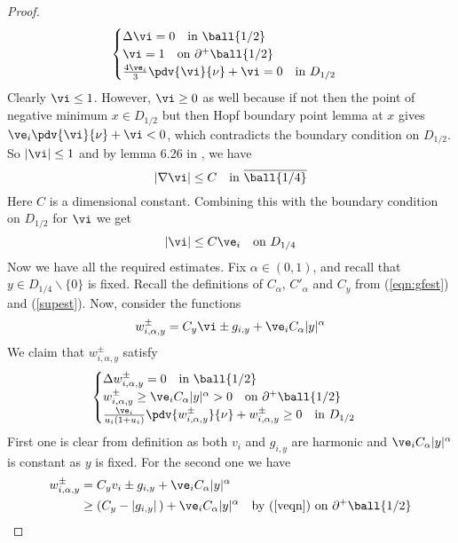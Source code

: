 \begin{proof}
\begin{equation}\label{veqn}
    \begin{cases}
        \Delta \vi =0 \quad \text{in } \ball {1/2} \\
        \vi = 1  \quad \text{on } \partial^{+}\ball {1/2} \\
        \frac{4\ve_i}{3} \pdv{\vi}{\nu} + \vi = 0 \quad \text{in } D_{1/2} 
    \end{cases}   
\end{equation}
Clearly $\vi \leq 1$. However, $\vi \geq 0$ as well because if not then the point of negative minimum $x \in D_{1/2}$ but then Hopf boundary point lemma at $x$ gives $\ve_i \pdv{\vi}{\nu} + \vi <0$, which contradicts the boundary condition on $D_{1/2}$. So $|\vi|\leq 1$ and by lemma 6.26 in \cite{gt}, we have $$|\nabla \vi| \leq C \quad \text{in } \overline{\ball {1/4}}  $$
Here $C$ is a dimensional constant. Combining this with the boundary condition on $D_{1/2}$ for $\vi$ we get 
\begin{equation}\label{veboundary}
    |\vi| \leq C\ve_i \quad \text{on } D_{1/4}
\end{equation}
Now we have all the required estimates. Fix $\alpha \in (0,1)$, and recall that $y\in D_{1/4} \backslash \{0\}$ is fixed. Recall the definitions of $C_\alpha$, $C'_\alpha$ and $C_y$ from (\ref{eqn:gfest}) and (\ref{supest}). Now, consider the functions $$w_{i,\alpha,y}^{\pm} = C_y \vi   \pm g_{i,y} + \ve_i C_\alpha|y|^{\alpha}$$ 
We claim that $w_{i,\alpha,y}^{\pm}$ satisfy 
\begin{equation} \label{weqn}
    \begin{cases}
        \Delta w_{i,\alpha,y}^{\pm}=0\quad  \text{in } \ball {1/2} \\
        w_{i,\alpha,y}^{\pm} \geq \ve_i C_\alpha|y|^{\alpha} > 0 \quad \text{on } \partial^{+}\ball {1/2} \\
        \frac{\ve_i}{u_i(1+u_i)} \pdv{w_{i,\alpha,y}^{\pm}}{\nu} + w_{i,\alpha,y}^{\pm}  \geq 0 \quad \text{in } D_{1/2}
    \end{cases}
\end{equation}
First one is clear from definition as both $v_i$ and $g_{i,y}$ are harmonic and $\ve_i C_\alpha|y|^\alpha$ is constant as $y$ is fixed. For the second one we have 
\begin{align*}
    w_{i,\alpha,y}^{\pm} &= C_y v_i \pm g_{i,y} +\ve_i C_\alpha|y|^{\alpha} \\
    &\geq (C_y - |g_{i,y}|\,) +\ve_i C_\alpha|y|^{\alpha}  \quad \text{by (\ref{veqn}) on }\partial^+ \ball {1/2} \\

\end{align*}
\end{proof}
